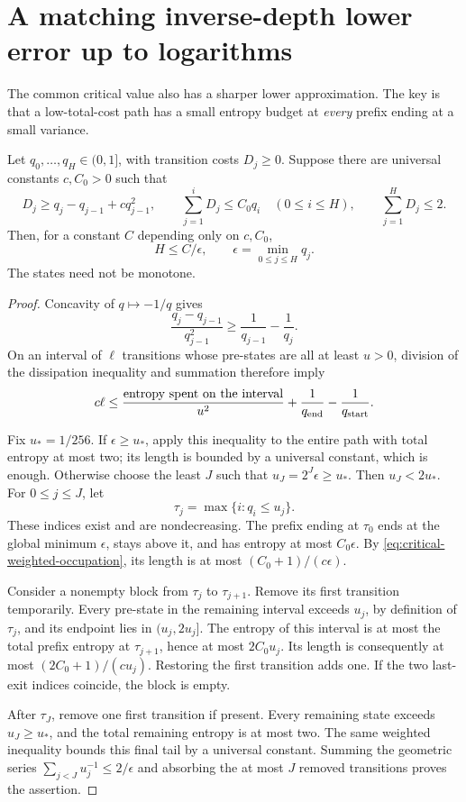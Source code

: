 \section{A matching inverse-depth lower error up to logarithms}
\label{sec:critical-sharp-lower}

The common critical value also has a sharper lower approximation.
The key is that a low-total-cost path has a small entropy budget at
\emph{every} prefix ending at a small variance.

\begin{lemma}
\label{lem:critical-last-exit}
Let $q_0,\ldots,q_H\in(0,1]$, with transition costs $D_j\ge0$.
Suppose there are universal constants $c,C_0>0$ such that
\[
 D_j\ge q_j-q_{j-1}+cq_{j-1}^2,
 \qquad \sum_{j=1}^{i}D_j\le C_0q_i\quad(0\le i\le H),
 \qquad \sum_{j=1}^H D_j\le2.
\]
Then, for a constant $C$ depending only on $c,C_0$,
\[
 H\le C/\epsilon,\qquad \epsilon=\min_{0\le j\le H}q_j.
\]
The states need not be monotone.
\end{lemma}

\begin{proof}
Concavity of $q\mapsto-1/q$ gives
\[
 \frac{q_j-q_{j-1}}{q_{j-1}^2}
 \ge\frac1{q_{j-1}}-\frac1{q_j}.
\]
On an interval of $\ell$ transitions whose pre-states are all at least
$u>0$, division of the dissipation inequality and summation therefore
imply
\begin{equation}\label{eq:critical-weighted-occupation}
 c\ell\le\frac{\text{entropy spent on the interval}}{u^2}
              +\frac1{q_{\rm end}}-\frac1{q_{\rm start}}.
\end{equation}

Fix $u_*=1/256$. If $\epsilon\ge u_*$, apply this inequality to
the entire path with total entropy at most two; its length is bounded
by a universal constant, which is enough. Otherwise choose the least
$J$ such that $u_J=2^J\epsilon\ge u_*$. Then
$u_J<2u_*$. For $0\le j\le J$, let
\[
 \tau_j=\max\{i:q_i\le u_j\}.
\]
These indices exist and are nondecreasing. The prefix ending at
$\tau_0$ ends at the global minimum $\epsilon$, stays above it,
and has entropy at most $C_0\epsilon$. By
\eqref{eq:critical-weighted-occupation}, its length is at most
$(C_0+1)/(c\epsilon)$.

Consider a nonempty block from $\tau_j$ to $\tau_{j+1}$.
Remove its first transition temporarily. Every pre-state in the
remaining interval exceeds $u_j$, by definition of $\tau_j$, and
its endpoint lies in $(u_j,2u_j]$. The entropy of this interval is
at most the total prefix entropy at $\tau_{j+1}$, hence at most
$2C_0u_j$. Its length is consequently at most
$(2C_0+1)/(cu_j)$. Restoring the first transition adds one.
If the two last-exit indices coincide, the block is empty.

After $\tau_J$, remove one first transition if present. Every remaining
state exceeds $u_J\ge u_*$, and the total remaining entropy is at most
two. The same weighted inequality bounds this final tail by a universal
constant. Summing the geometric series
$\sum_{j<J}u_j^{-1}\le2/\epsilon$ and absorbing the at most $J$
removed transitions proves the assertion.
\end{proof}

